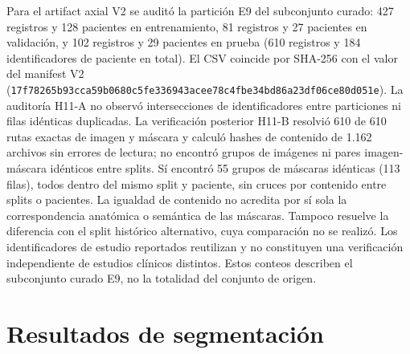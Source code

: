 Para el artifact axial V2 se auditó la partición E9 del subconjunto curado: 427 registros y 128 pacientes en entrenamiento, 81 registros y 27 pacientes en validación, y 102 registros y 29 pacientes en prueba (610 registros y 184 identificadores de paciente en total). El CSV  coincide por SHA-256 con el valor del manifest V2 (\texttt{17f78265}\allowbreak\texttt{b93cca59}\allowbreak\texttt{b0680c5f}\allowbreak\texttt{e336943a}\allowbreak\texttt{cee78c4f}\allowbreak\texttt{be34bd86}\allowbreak\texttt{a23df06c}\allowbreak\texttt{e80d051e}). La auditoría H11-A no observó intersecciones de identificadores entre particiones ni filas idénticas duplicadas. La verificación posterior H11-B resolvió 610 de 610 rutas exactas de imagen y máscara y calculó hashes de contenido de 1.162 archivos sin errores de lectura; no encontró grupos de imágenes ni pares imagen-máscara idénticos entre splits. Sí encontró 55 grupos de máscaras idénticas (113 filas), todos dentro del mismo split y paciente, sin cruces por contenido entre splits o pacientes. La igualdad de contenido no acredita por sí sola la correspondencia anatómica o semántica de las máscaras. Tampoco resuelve la diferencia con el split histórico alternativo, cuya comparación no se realizó. Los identificadores de estudio reportados reutilizan  y no constituyen una verificación independiente de estudios clínicos distintos. Estos conteos describen el subconjunto curado E9, no la totalidad del conjunto de origen.

\section{Resultados de segmentación}


